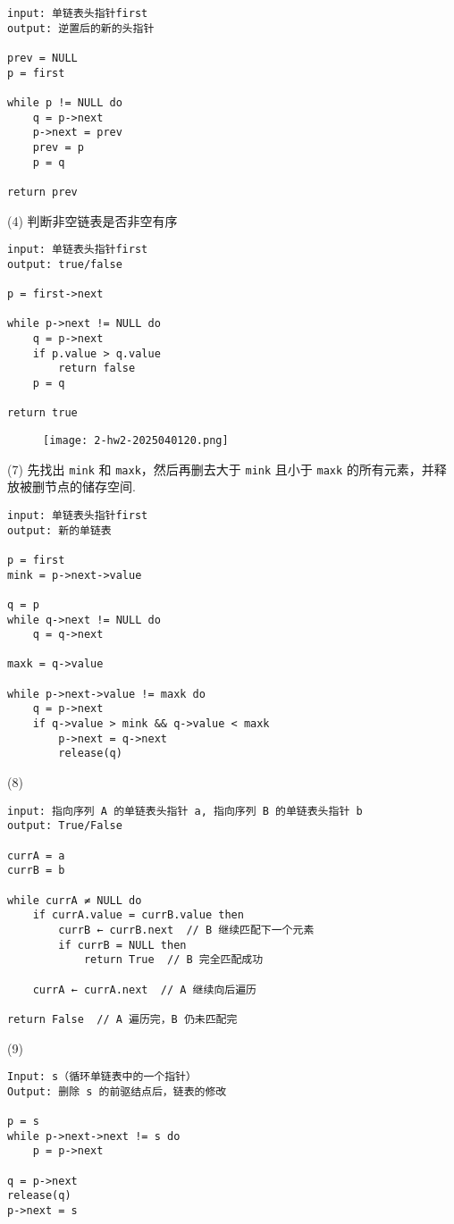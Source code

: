 \begin{lstlisting}
input: 单链表头指针first
output: 逆置后的新的头指针

prev = NULL
p = first

while p != NULL do
    q = p->next
    p->next = prev
    prev = p
    p = q

return prev
\end{lstlisting}
(4)
判断非空链表是否非空有序

\begin{lstlisting}
input: 单链表头指针first
output: true/false

p = first->next

while p->next != NULL do 
    q = p->next
    if p.value > q.value
        return false
    p = q

return true
\end{lstlisting}
\begin{figure}[H]
\centering
\texttt{[image: 2-hw2-2025040120.png]}
\label{}
\end{figure}

(7)
先找出 \lstinline{mink} 和 \lstinline{maxk}，然后再删去大于 \lstinline{mink} 且小于 \lstinline{maxk} 的所有元素，并释放被删节点的储存空间.

\begin{lstlisting}
input: 单链表头指针first
output: 新的单链表

p = first
mink = p->next->value

q = p
while q->next != NULL do
    q = q->next

maxk = q->value

while p->next->value != maxk do
    q = p->next
    if q->value > mink && q->value < maxk
        p->next = q->next
        release(q)

\end{lstlisting}
(8)

\begin{lstlisting}
input: 指向序列 A 的单链表头指针 a, 指向序列 B 的单链表头指针 b
output: True/False 

currA = a
currB = b

while currA ≠ NULL do
    if currA.value = currB.value then
        currB ← currB.next  // B 继续匹配下一个元素
        if currB = NULL then
            return True  // B 完全匹配成功

    currA ← currA.next  // A 继续向后遍历

return False  // A 遍历完，B 仍未匹配完
\end{lstlisting}
(9)

\begin{lstlisting}
Input: s（循环单链表中的一个指针）
Output: 删除 s 的前驱结点后，链表的修改

p = s
while p->next->next != s do
    p = p->next

q = p->next
release(q)
p->next = s
\end{lstlisting}